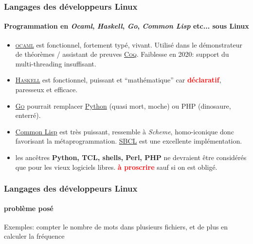 \documentclass[xcolor=svgnames,final,smaller,a4]{beamer}
\begin{document}
\begin{frame}
  \frametitle{Langages des développeurs Linux}
  \framesubtitle{Programmation en \textit{Ocaml},  \textit{Haskell}, \textit{Go}, \textit{Common Lisp} etc... sous Linux}

  \begin{itemize}
\item \href{https://www.ocaml.org/}{\textsc{ocaml}} est fonctionnel,
  fortement typé, vivant. Utilisé dans le démonstrateur de théorèmes /
  assistant de preuves
  \href{https://coq.inria.fr/}{\textsc{Coq}}. Faiblesse en 2020:
  support du multi-threading insuffisant.
  
\item  \href{https://www.haskell.org/}{\textsc{Haskell}} est fonctionnel,
  puissant et ``mathématique'' car
  \textcolor{red}{\textbf{déclaratif}}, paresseux et efficace. 

\item  \href{https://go-lang.org}{\textsc{Go}} pourrait remplacer \href{http://python.org/}{Python} (quasi mort, moche) ou PHP (dinosaure, enterré).


\item  \href{https://fr.wikipedia.org/wiki/Common_Lisp}{Common Lisp} est très puissant, ressemble à \textit{Scheme}, homo-iconique donc favorisant la métaprogrammation. \href{https://sbcl.org/}{SBCL} est une excellente implémentation.

\item les ancêtres \textbf{Python, TCL, shells, Perl, PHP} ne devraient être considérés
  que pour les vieux logiciels libres. \textcolor{red}{\textbf{à
      proscrire}} sauf si on est obligé.
  \end{itemize}
\end{frame}

\begin{frame}
  \frametitle{Langages des développeurs Linux}
  \framesubtitle{problème posé}

  Exemples: compter le nombre de mots dans plusieurs fichiers, et de plus en calculer la fréquence
\end{frame}
\end{document}
